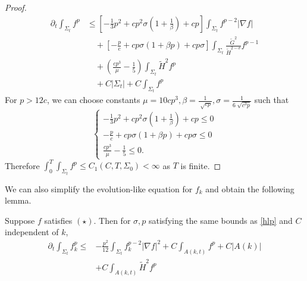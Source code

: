 \begin{proof}
    \begin{equation}
    \begin{split}
        \partial _t \int_{\Sigma_t} f^p 
    &\leq \left[ -\frac{1}{3}p^2+cp^2 \sigma (1+\frac{1}{\beta })+cp \right] \int_{\Sigma_t} f_{}^{p-2} \left| \nabla f \right|   \\
    &\quad + \left[ -\frac{p}{c}+cp \sigma (1+\beta p)+cp \sigma  \right] \int_{\Sigma_t} \frac{\tilde{G}^2}{\tilde{H}^{2-\sigma }}f^{p-1}\\
    &\quad + \left( \frac{cp^3}{\mu }-\frac{1}{5} \right) \int_{\Sigma_t} \tilde{H}^2f^{p}\\
    &\quad + C \left| \Sigma _t \right| + C \int_{\Sigma_t} f^p
    \end{split}
    \end{equation} 
    For $p>12c$, we can choose constants $\mu=10cp^3 , \beta=\frac{1}{\sqrt[]{cp}} , \sigma=\frac{1}{6 \sqrt[]{c^3p}} $ such that
    \[
    \begin{cases}
        -\frac{1}{3}p^2+cp^2 \sigma (1+\frac{1}{\beta })+cp \leq 0\\
        -\frac{p}{c}+cp \sigma (1+\beta p)+cp \sigma \leq 0\\
        \frac{cp^3}{\mu }-\frac{1}{5} \leq 0.
    \end{cases}
    \]
    Therefore $\int_{0}^{T}\int_{\Sigma_t} f^p \leq C_1(C,T,\Sigma _0) <\infty$ as $T$ is finite.
\end{proof}

We can also simplify the evolution-like equation for $f_k$ and obtain the following lemma.

\begin{lemma}
    Suppose $f$ satisfies $(\star )$. Then for $\sigma , p$ satisfying the same bounds as \autoref{hlp} and $C$ independent of $k$,
    \begin{equation*}
    \begin{split}
        \partial_t \int_{\Sigma_t} f_k^p \leq &  -\frac{p^2}{12} \int_{\Sigma_t} f_{k}^{p-2}\left| \nabla f \right| ^2+C \int_{A(k,t)} f^p +C \left| A(k) \right|\\ \quad &+ C \int_{A(k,t)}^{}\tilde{H}^2f^p\\
    \end{split}
    \end{equation*}  
\end{lemma}

